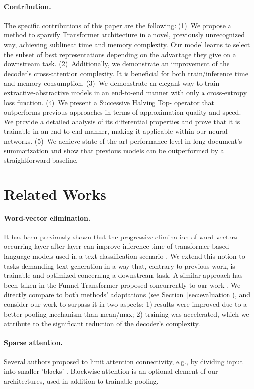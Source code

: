 \documentclass{article}
\begin{document}
\paragraph{Contribution.} The specific contributions of this paper are the following: (1)~We propose a method to sparsify Transformer architecture in a novel, previously unrecognized way, achieving sublinear time and memory complexity. Our model learns to select the subset of best representations depending on the advantage they give on a downstream task.
(2)~Additionally, we demonstrate an improvement of the decoder's cross-attention complexity. It is beneficial for both train/inference time and memory consumption.
(3)~We demonstrate an elegant way to train extractive-abstractive models in an end-to-end manner with only a cross-entropy loss function. (4)~We present a Successive Halving Top- operator that outperforms previous approaches in terms of approximation quality and speed. We provide a detailed analysis of its differential properties and prove that it is trainable in an end-to-end manner, making it applicable within our neural networks. (5)~We achieve state-of-the-art performance level in long document's summarization and show that previous models can be outperformed by a straightforward baseline.

\section{Related Works}  
\paragraph{Word-vector elimination.}
It has been previously shown that the progressive elimination of word vectors occurring layer after layer can improve inference time of transformer-based language models used in a text classification scenario \cite{pmlr-v119-goyal20a}. We extend this notion to tasks demanding text generation in a way that, contrary to previous work, is trainable and optimized concerning a downstream task. A similar approach has been taken in the Funnel Transformer proposed concurrently to our work \citep{dai2020funneltransformer}. We directly compare to both methods' adaptations (see Section~\ref{sec:evaluation}), and consider our work to surpass it in two aspects: 1) results were improved due to a better pooling mechanism than mean/max; 2) training was accelerated, which we attribute to the significant reduction of the decoder's complexity.

\paragraph{Sparse attention.} 
Several authors proposed to limit attention connectivity, e.g., by dividing input into smaller 'blocks' \citep{child2019generating, Beltagy2020LongformerTL, rae-razavi-2020-transformers}. 
Blockwise attention is an optional element of our architectures, used in addition to trainable pooling.
\end{document}
